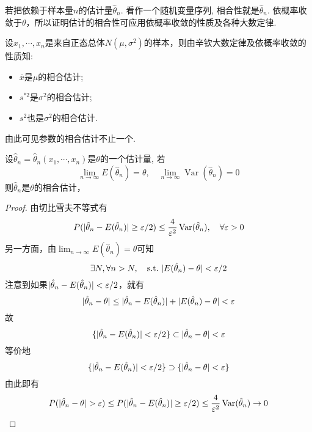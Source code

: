 若把依赖于样本量$n$的估计量$\hat\theta_n$. 看作一个随机变量序列, 相合性就是$\hat\theta_n$. 依概率收敛于$\theta$，所以证明估计的相合性可应用依概率收敛的性质及各种大数定律.

\begin{example}\label{exam:6.2.1}
    设$x_1,\cdots,x_n$是来自正态总体$N(\mu,\sigma^2)$的样本，则由辛钦大数定律及依概率收敛的性质知:
    \begin{itemize}
        \item$\bar x$是$\mu$的相合估计;
        \item$s^{*2}$是$\sigma^2$的相合估计;
        \item$s^2$也是$\sigma^2$的相合估计.
    \end{itemize}
    由此可见参数的相合估计不止一个.
\end{example}

\begin{theorem}[相合性定理]
    设$\hat\theta_n=\hat\theta_n(x_1,\cdots,x_n)$是$\theta$的一个估计量, 若
    \[ \lim_{n \to \infty} E(\hat\theta_n)=\theta, \quad \lim_{n \to \infty} \operatorname{Var}(\hat\theta_n)=0 \]
    则$\hat\theta_n$是$\theta$的相合估计，
\end{theorem}
\begin{proof}
    由切比雪夫不等式有
    \[ P(|\hat\theta_n - E(\hat\theta_n)| \geq \varepsilon/2) \leq \frac{4}{\varepsilon^2} \operatorname{Var}(\hat\theta_n), \quad \forall  \varepsilon>0\]
    另一方面，由$\lim_{n \to \infty} E(\hat\theta_n)=\theta$可知
    \[ \exists N , \forall n>N ,\quad \mathrm{s.t.}\  |E(\hat\theta_n)-\theta| < \varepsilon/2\]
    注意到如果$|\hat\theta_n-E(\hat\theta_n)|<\varepsilon/2$，就有
    \[ |\hat\theta_n - \theta| \leq |\hat\theta_n - E(\hat\theta_n)|+|E(\hat\theta_n) - \theta| < \varepsilon\]
    故
    \[ \{|\hat\theta_n - E(\hat\theta_n)| < \varepsilon/2\} \subset | \hat\theta_n - \theta | < \varepsilon \]
    等价地
    \[ \{ |\hat\theta_n - E(\hat\theta_n)| < \varepsilon/2 \} \supset \{|\hat\theta_n - \theta| < \varepsilon \}\]
    由此即有
    \[ P(|\hat\theta_n - \theta| > \varepsilon) \leq P(|\hat\theta_n - E(\hat\theta_n)| \geq \varepsilon/2) \leq \frac{4}{\varepsilon^2} \operatorname{Var}(\hat\theta_n) \to 0 \]
\end{proof}

